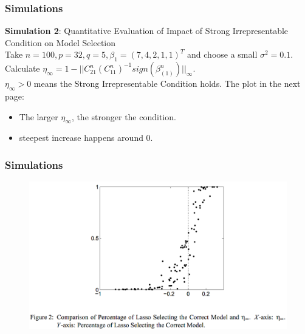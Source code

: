 \documentclass{beamer}
\begin{document}
	\begin{frame}
		\frametitle{Simulations}
		\textbf{Simulation 2}: Quantitative Evaluation of Impact of Strong Irrepresentable Condition on Model Selection\\
		Take $n=100, p = 32, q = 5, \beta_1 = (7,4,2,1,1)^T$ and choose a small $\sigma^2 = 0.1$. Calculate $\eta_{\infty} = 1 - ||C_{21}^n(C_{11}^n)^{-1}sign(\beta_{(1)}^n)||_{\infty}$.\\
		\vspace{\baselineskip}
		$\eta_{\infty} > 0$ means the Strong Irrepresentable Condition holds. The plot in the next page:
		\begin{itemize}
			\item 
			The larger $\eta_{\infty}$, the stronger the condition.
			\item
			steepest increase happens around 0.
		\end{itemize}
		
		
		 
	\end{frame}
	
	\begin{frame}
		\frametitle{Simulations}
		\begin{figure}
			\includegraphics[width=1\linewidth]{image017.png}
		\end{figure}
	\end{frame}
	
\end{document}
